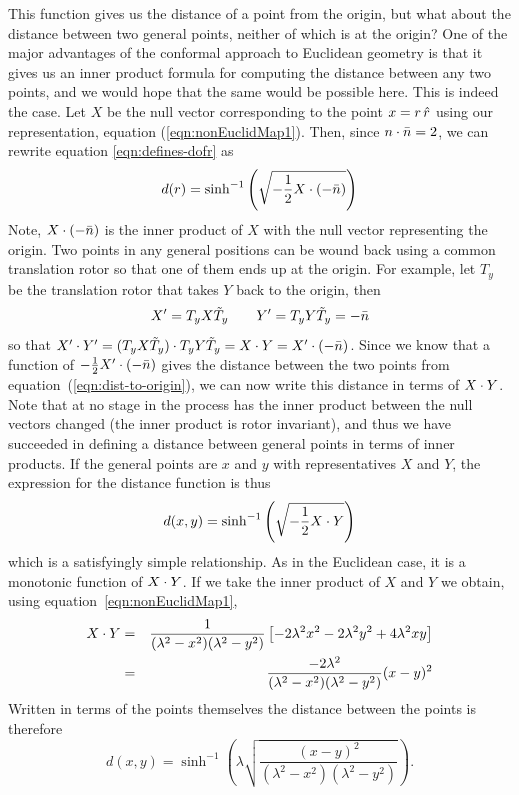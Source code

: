 This function gives us the distance of a point from the
origin, but what about the distance between two general
points, neither of which is at the origin? One of the
major advantages of the conformal approach to Euclidean
geometry is that it gives us an inner product formula for
computing the distance between any two points, and we
would hope that the same would be possible here. This is
indeed the case. Let $X$ be the null vector corresponding
to the point $x=r\, \hat{r}$ using our representation,
equation (\ref{eqn:nonEuclidMap1}). Then, since $n\cdot\bar{n} =
2$, we can rewrite equation \ref{eqn:defines-dofr} as
%
\begin{equation} \label{eqn:dist-to-origin}
d(r) = \sinh^{-1}\left(\sqrt{-\frac{1}{2} X \cdot (-\bar{n}) }
\right)
\end{equation}
%
Note, $X \cdot (-\bar{n})$ is the inner product of $X$ with the
null vector representing the origin. Two points in any
general positions can be wound back using a common
translation rotor so that one of them ends up at the
origin. For example, let $T_y$ be the translation rotor
that takes $Y$ back to the origin, then
%
\[ X' = T_y X \tilde{T}_y \qquad  Y' = T_y Y \tilde{T}_y
= -\bar{n}
\]
%
so that $X'\cdot Y' = (T_y X \tilde{T}_y)\cdot T_y Y \tilde{T}_y =
X\cdot Y =  X'\cdot (-\bar{n})$. Since we know that a function of $-\frac{1}{2}
X'\cdot (-\bar{n})$ gives the distance between the two points from
equation~(\ref{eqn:dist-to-origin}), we can now write this
distance in terms of $X\cdot Y$. Note that at no stage in the
process has the inner product between the null vectors changed (the
inner product is rotor invariant), and thus we have succeeded in
defining a distance between general points in terms of inner
products. If the general points are $x$ and $y$ with
representatives $X$ and $Y$, the expression for the distance
function is thus
%
\begin{equation}\label{eqn:general-dist-formula}
d(x,y) = \sinh^{-1}\left(\sqrt{-\frac{1}{2} X \cdot Y }
\right)
\end{equation}
%
which is a satisfyingly simple relationship. As in the
Euclidean case, it is a monotonic function of $X\cdot Y$.
If we take the inner product of $X$ and $Y$ we obtain,
using equation~\ref{eqn:nonEuclidMap1},
%
\begin{eqnarray}
X\cdot Y  & = &
\frac{1}{(\lambda^2-x^2)(\lambda^2-y^2)}\left[-2\lambda^2x^2-2\lambda^2y^2+4\lambda^2xy\right] \nonumber \\
  &  =  &
  \frac{-2\lambda^2}{(\lambda^2-x^2)(\lambda^2-y^2)}(x-y)^2
  \end{eqnarray}
%
Written in terms of the points themselves the distance
between the points is therefore
%
\begin{equation}\label{eqn:general-dist-formula-points}
d(x,y) = \sinh^{-1}\left(\lambda
\sqrt{\frac{(x-y)^2}{(\lambda^2-x^2)(\lambda^2-y^2)} }
\right).
\end{equation}
%

